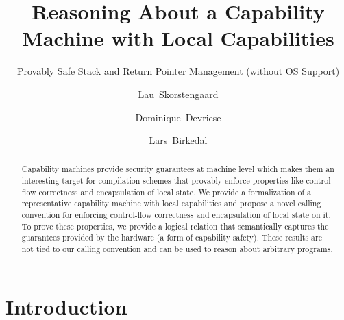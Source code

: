 \documentclass{llncs}
\begin{document}
\title{Reasoning About a Capability Machine with Local Capabilities}         %
\subtitle{Provably Safe Stack and Return Pointer Management (without OS Support)}                     %





\author{Lau~Skorstengaard \and Dominique~Devriese \and Lars~Birkedal}

\maketitle

\begin{abstract}
  Capability machines provide security guarantees at machine level which makes
  them an interesting target for compilation schemes that provably enforce
  properties like control-flow correctness and encapsulation of local state. We
  provide a formalization of a representative capability machine with local
  capabilities and propose a novel calling convention for enforcing control-flow
  correctness and encapsulation of local state on it. To prove these properties,
  we provide a logical relation that semantically captures the guarantees
  provided by the hardware (a form of capability safety). These results are not
  tied to our calling convention and can be used to reason about arbitrary
  programs.
\end{abstract}



\section{Introduction}
\label{sec:introduction}
\end{document}
